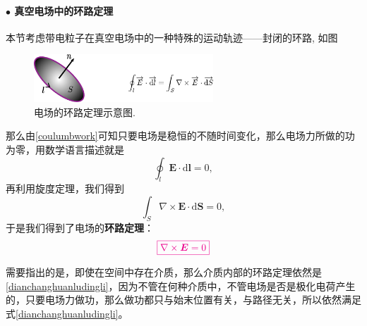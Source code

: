 \documentclass[10pt,reqno, final]{ctexart}
\begin{document}
\paragraph{$\bullet$ 真空电场中的环路定理} 本节考虑带电粒子在真空电场中的一种特殊的运动轨迹——封闭的环路, 如图 
\begin{figure}[htp]
	\centering
	\includegraphics[width=0.6\textwidth]{Figures/dianchanghuanludingli}
	\caption {电场的环路定理示意图. }
	\label{dianchanghuanludingli}
\end{figure}

那么由\eqref{coulumbwork}可知只要电场是稳恒的不随时间变化，那么电场力所做的功为零，用数学语言描述就是
\begin{equation}
\oint_l \bm{E}\cdot \mathrm{d}\bm{l} = 0,
\end{equation}
再利用旋度定理，我们得到
\begin{equation}
\int_S \nabla \times \bm{E} \cdot \mathrm{d}\bm{S} = 0,
\end{equation}
于是我们得到了电场的\textbf{环路定理}：
\begin{equation}\label{dianchanghuanludingli}
\color{magenta}\boxed{\nabla\times\bm{E} = 0}
\end{equation}

需要指出的是，即使在空间中存在介质，那么介质内部的环路定理依然是\eqref{dianchanghuanludingli}，因为不管在何种介质中，不管电场是否是极化电荷产生的，只要电场力做功，那么做功都只与始末位置有关，与路径无关，所以依然满足式\eqref{dianchanghuanludingli}。





\end{document}
